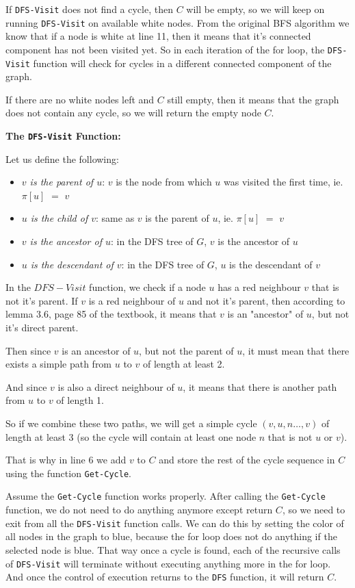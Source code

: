 \documentclass{article}
\begin{document}
If \texttt{DFS-Visit} does not find a cycle, then $C$ will be empty, so we will keep on running \texttt{DFS-Visit} on available white nodes. From the original BFS algorithm we know that if a node is white at line 11, then it means that it's connected component has not been visited yet. So in each iteration of the for loop, the \texttt{DFS-Visit} function will check for cycles in a different connected component of the graph.

If there are no white nodes left and $C$ still empty, then it means that the graph does not contain any cycle, so we will return the empty node $C$.

\textbf{The \texttt{DFS-Visit} Function:}

Let us define the following:
\begin{itemize}
    \item \textit{$v$ is the parent of $u$}: $v$ is the node from which $u$ was visited the first time, ie. $\pi[u]$ $=$ $v$
    \item \textit{$u$ is the child of $v$}: same as $v$ is the parent of $u$, ie. $\pi[u]$ $=$ $v$
    \item \textit{$v$ is the ancestor of $u$}: in the DFS tree of $G$, $v$ is the ancestor of $u$
    \item \textit{$u$ is the descendant of $v$}: in the DFS tree of $G$, $u$ is the descendant of $v$ 
\end{itemize}

In the $DFS-Visit$ function, we check if a node $u$ has a red neighbour $v$ that is not it's parent. If $v$ is a red neighbour of $u$ and not it's parent, then according to lemma 3.6, page 85 of the textbook, it means that $v$ is an "ancestor" of $u$, but not it's direct parent.

Then since $v$ is an ancestor of $u$, but not the parent of $u$, it must mean that there exists a simple path from $u$ to $v$ of length at least 2.

And since $v$ is also a direct neighbour of $u$, it means that there is another path from $u$ to $v$ of length 1.

So if we combine these two paths, we will get a simple cycle $(v, u, n \dots, v)$ of length at least 3 (so the cycle will contain at least one node $n$ that is not $u$ or $v$).

That is why in line 6 we add $v$ to $C$ and store the rest of the cycle sequence in $C$ using the function \texttt{Get-Cycle}.

Assume the \texttt{Get-Cycle} function works properly. After calling the \texttt{Get-Cycle} function, we do not need to do anything anymore except return $C$, so we need to exit from all the \texttt{DFS-Visit} function calls. We can do this by setting the color of all nodes in the graph to blue, because the for loop does not do anything if the selected node is blue. That way once a cycle is found, each of the recursive calls of \texttt{DFS-Visit} will terminate without executing anything more in the for loop. And once the control of execution returns to the \texttt{DFS} function, it will return $C$.
\end{document}
